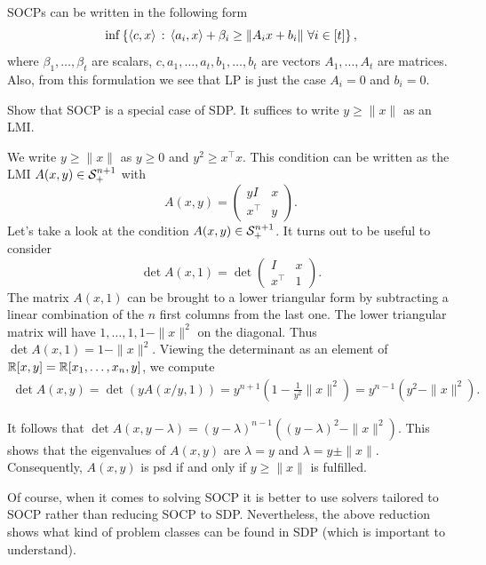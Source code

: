 	SOCPs can be written in the following form 
	\[
		\inf \left\{  \left\langle c , x \right\rangle  \,:\,  \left\langle a_i , x \right\rangle + \beta_i \ge \| A_i x + b_i \| \ \forall i \in [t] \right\},
	\]
	where $\beta_1,\ldots,\beta_t$ are scalars, $c,a_1,\ldots,a_t,b_1,\ldots,b_t$ are vectors  $A_1,\ldots,A_t$ are matrices. Also, from this formulation we see that LP is just the case $A_i=0$ and $b_i=0$.  
	
	\begin{exercise}
	 Show that SOCP is a special case of SDP. It suffices to write  $y \ge  \| x \|$ as an LMI. 
	\end{exercise}
	\begin{solution}
	 We write  $y \ge \| x \|$ as $y \ge 0$ and $y^2 \ge x^\top x$.  This condition can be written as the LMI $A(x,y) \in \mathcal{S}_+^{n+1}$ with
	\[
	A(x,y) = \begin{pmatrix} 
	y I & x
	\\ x^\top & y
	\end{pmatrix}.
	\]
	Let's take a look at the condition $A(x,y) \in \mathcal{S}_+^{n+1}$. It turns out to be useful to consider 
	\[
		\det A(x,1) = \det \begin{pmatrix} 
		 I & x
		\\ x^\top & 1
		\end{pmatrix} .
	\]
	The matrix $A(x,1)$ can be brought to a lower triangular form by subtracting a linear combination of the $n$ first columns from the last one. The lower triangular matrix will have $1,\ldots,1, 1- \| x \|^2$ on the diagonal. Thus $\det A(x,1) = 1 - \| x \|^2$. Viewing the determinant as an element of $\mathbb{R}[x,y] = \mathbb{R}[x_1,\ldots,x_n,y]$, we compute
	\begin{align*}
		\det A(x,y) = \det (y A(x/y,1)) = y^{n+1} ( 1 - \frac{1}{y^2} \| x\|^2) = y^{n-1}( y^2  - \|x\|^2). 
	\end{align*}
	
	It follows that $\det A(x,y-\lambda) = (y-\lambda)^{n-1} ((y-\lambda)^2 - \|x\|^2)$. This shows that the eigenvalues of $A(x,y)$ are $\lambda = y$ and $\lambda = y \pm \| x \|$. Consequently, $A(x,y)$ is psd if and only if $y \ge \| x \| $ is fulfilled.
	\end{solution}
	
	\begin{remark}
		Of course, when it comes to solving SOCP it is better to use solvers tailored to SOCP rather than reducing SOCP to SDP. Nevertheless, the above reduction shows what kind of problem classes can be found in SDP (which is important to understand). 
	\end{remark}
	

